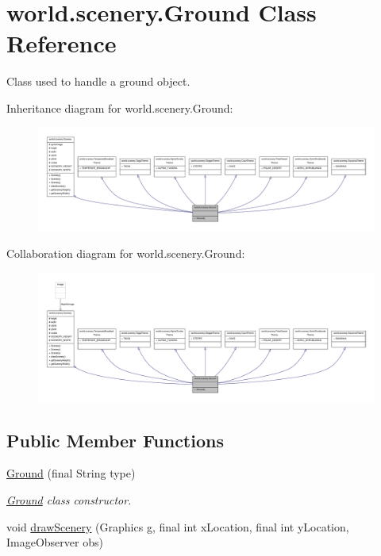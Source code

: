 \hypertarget{a00012}{\section{world.\-scenery.\-Ground Class Reference}
\label{a00012}
}


Class used to handle a ground object.  




Inheritance diagram for world.\-scenery.\-Ground\-:
\nopagebreak
\begin{figure}[H]
\begin{center}
\leavevmode
\includegraphics[width=350pt]{a00164}
\end{center}
\end{figure}


Collaboration diagram for world.\-scenery.\-Ground\-:
\nopagebreak
\begin{figure}[H]
\begin{center}
\leavevmode
\includegraphics[width=350pt]{a00165}
\end{center}
\end{figure}
\subsection*{Public Member Functions}
\begin{DoxyCompactItemize}
\item 
\hyperlink{a00012_a8fd1a2b95d8136913879fe89d3a7263a}{Ground} (final String type)
\begin{DoxyCompactList}\small\item\em \hyperlink{a00012}{Ground} class constructor. \end{DoxyCompactList}\item 
void \hyperlink{a00024_a626c1ae7fa15d2f96d564c35368fdbc9}{draw\-Scenery} (Graphics g, final int x\-Location, final int y\-Location, Image\-Observer obs)
\end{DoxyCompactItemize}
